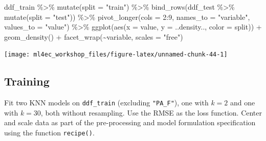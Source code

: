 \documentclass[
]{book}
\newenvironment{Shaded}{\begin{snugshade}}{\end{snugshade}}
\newcommand{\AttributeTok}[1]{\textcolor[rgb]{0.77,0.63,0.00}{#1}}
\newcommand{\DecValTok}[1]{\textcolor[rgb]{0.00,0.00,0.81}{#1}}
\newcommand{\FunctionTok}[1]{\textcolor[rgb]{0.00,0.00,0.00}{#1}}
\newcommand{\NormalTok}[1]{#1}
\newcommand{\SpecialCharTok}[1]{\textcolor[rgb]{0.00,0.00,0.00}{#1}}
\newcommand{\StringTok}[1]{\textcolor[rgb]{0.31,0.60,0.02}{#1}}
\begin{document}
\begin{Shaded}
\begin{Highlighting}[]
\NormalTok{ddf\_train }\SpecialCharTok{\%\textgreater{}\%} 
  \FunctionTok{mutate}\NormalTok{(}\AttributeTok{split =} \StringTok{"train"}\NormalTok{) }\SpecialCharTok{\%\textgreater{}\%} 
  \FunctionTok{bind\_rows}\NormalTok{(ddf\_test }\SpecialCharTok{\%\textgreater{}\%} 
    \FunctionTok{mutate}\NormalTok{(}\AttributeTok{split =} \StringTok{"test"}\NormalTok{)) }\SpecialCharTok{\%\textgreater{}\%} 
  \FunctionTok{pivot\_longer}\NormalTok{(}\AttributeTok{cols =} \DecValTok{2}\SpecialCharTok{:}\DecValTok{9}\NormalTok{, }\AttributeTok{names\_to =} \StringTok{"variable"}\NormalTok{, }\AttributeTok{values\_to =} \StringTok{"value"}\NormalTok{) }\SpecialCharTok{\%\textgreater{}\%} 
  \FunctionTok{ggplot}\NormalTok{(}\FunctionTok{aes}\NormalTok{(}\AttributeTok{x =}\NormalTok{ value, }\AttributeTok{y =}\NormalTok{ ..density.., }\AttributeTok{color =}\NormalTok{ split)) }\SpecialCharTok{+}
  \FunctionTok{geom\_density}\NormalTok{() }\SpecialCharTok{+}
  \FunctionTok{facet\_wrap}\NormalTok{(}\SpecialCharTok{\textasciitilde{}}\NormalTok{variable, }\AttributeTok{scales =} \StringTok{"free"}\NormalTok{)}
\end{Highlighting}
\end{Shaded}

\begin{center}\texttt{[image: ml4ec\_workshop\_files/figure-latex/unnamed-chunk-44-1]} \end{center}

\hypertarget{training-5}{%
\subsection{Training}\label{training-5}}

Fit two KNN models on \texttt{ddf\_train} (excluding \texttt{"PA\_F"}), one with \(k = 2\) and one with \(k = 30\), both without resampling. Use the RMSE as the loss function. Center and scale data as part of the pre-processing and model formulation specification using the function \texttt{recipe()}.
\end{document}
